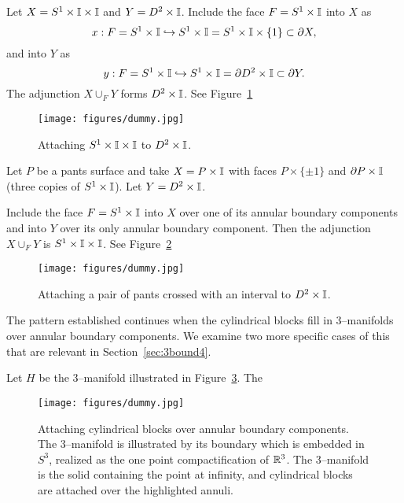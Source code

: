 \begin{ex}
	\label{ex:AxIuDxI}
	Let $X=S^1\times\mathbb{I}\times\mathbb{I}$ and $Y=D^2\times\mathbb{I}$.
	Include the face $F=S^1\times\mathbb{I}$ into $X$ as
	\[
		x:F= S^1\times\mathbb{I} \hookrightarrow S^1\times\mathbb{I}=S^1 \times\mathbb{I}\times\{1\}\subset \partial X,
	\]
	and into $Y$ as
	\[
		y:F= S^1\times\mathbb{I}\hookrightarrow S^1\times\mathbb{I}=\partial D^2 \times\mathbb{I}\subset \partial Y.
	\]
	The adjunction $X\cup_F Y$ forms $D^2\times\mathbb{I}$.
	See Figure~\ref{fig:AxIuDxI}
\end{ex}

\begin{figure}[H]
	\centering
	\caption{Attaching $S^1\times\mathbb{I}\times\mathbb{I}$ to $D^2\times\mathbb{I}$.}
	\texttt{[image: figures/dummy.jpg]}
	\label{fig:AxIuDxI}
\end{figure}

\begin{ex}
	\label{ex:PxIuDxI}
	Let $P$ be a pants surface and take $X=P\times\mathbb{I}$ with faces $P\times\{\pm 1\}$ and $\partial P\times\mathbb{I}$ (three copies of $S^1\times \mathbb{I}$).
	Let $Y=D^2\times\mathbb{I}$.
	
	Include the face $F=S^1\times\mathbb{I}$ into $X$ over one of its annular boundary components and into $Y$ over its only annular boundary component.
	Then the adjunction $X\cup_F Y$ is $ S^1\times\mathbb{I}\times\mathbb{I} $.
	See Figure~\ref{fig:PxIuDxI}
\end{ex}

\begin{figure}[H]
	\centering
	\caption{Attaching a pair of pants crossed with an interval to $D^2\times\mathbb{I}$.}
	\texttt{[image: figures/dummy.jpg]}
	\label{fig:PxIuDxI}
\end{figure}

The pattern established continues when the cylindrical blocks fill in 3--manifolds over annular boundary components.
We examine two more specific cases of this that are relevant in Section~\ref{sec:3bound4}.

\begin{ex}
	\label{ex:interactivefiber1uDxI}
	Let $H$ be the 3--manifold illustrated in Figure~\ref{fig:interactivefiber1uDxI}.
	The 
	
\end{ex}

\begin{figure}[H]
	\centering
	\caption{Attaching cylindrical blocks over annular boundary components.
	The 3--manifold is illustrated by its boundary which is embedded in $S^3$, realized as the one point compactification of $ \mathbb{R}^3 $.
	The 3--manifold is the solid containing the point at infinity, and cylindrical blocks are attached over the highlighted annuli.}
	\texttt{[image: figures/dummy.jpg]}
	\label{fig:interactivefiber1uDxI}
\end{figure}



